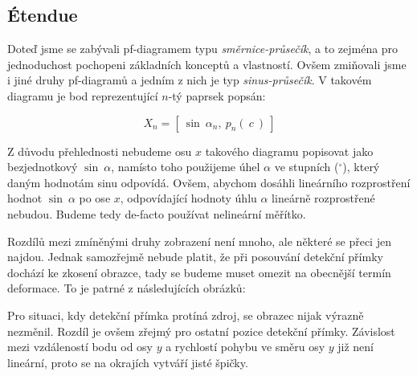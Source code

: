 \subsection{Étendue}

Doteď jsme se zabývali pf-diagramem typu \emph{směrnice-průsečík}, a to zejména pro jednoduchost pochopeni základních konceptů a vlastností. Ovšem zmiňovali jsme i jiné druhy pf-diagramů a jedním z nich je typ \emph{sinus-průsečík}. V takovém diagramu je bod reprezentující $n$-tý paprsek popsán:

\[ X_n = [\ \sin\ \alpha_n,\ p_n(\ c\ )\ ] \]

Z důvodu přehlednosti nebudeme osu $x$ takového diagramu popisovat jako bezjednotkový $\sin\ \alpha$, namísto toho použijeme úhel $\alpha$ ve stupních ($^{\circ}$), který daným hodnotám sinu odpovídá. Ovšem, abychom dosáhli lineárního rozprostření hodnot $\sin\ \alpha$ po ose $x$, odpovídající hodnoty úhlu $\alpha$ lineárně rozprostřené nebudou. Budeme tedy de-facto používat nelineární měřítko.

Rozdílů mezi zmíněnými druhy zobrazení není mnoho, ale některé se přeci jen najdou. Jednak samozřejmě nebude platit, že při posouvání detekční přímky dochází ke zkosení obrazce, tady se budeme muset omezit na obecnější termín deformace. To je patrné z následujících obrázků:


Pro situaci, kdy detekční přímka protíná zdroj, se obrazec nijak výrazně nezměnil. Rozdíl je ovšem zřejmý pro ostatní pozice detekční přímky. Závislost mezi vzdáleností bodu od osy $y$ a rychlostí pohybu ve směru osy $y$ již není lineární, proto se na okrajích vytváří jisté špičky.


